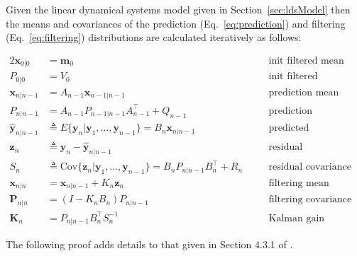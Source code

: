 \begin{theorem}
	\label{thm:kalmanFilterEqs}

    Given the linear dynamical systems model given in
    Section~\ref{sec:ldsModel} then the means and covariances of the prediction
    (Eq.~\ref{eq:prediction}) and filtering (Eq.~\ref{eq:filtering})
    distributions are calculated iteratively as follows:

    \begin{alignat}{2}
        \mathbf{x}_{0|0}&=\mathbf{m}_0&&\text{init filtered mean}\label{eq:x0G0}\\
        P_{0|0}&=V_0&&\text{init filtered covariance}\label{eq:P0G0}\\
        \mathbf{x}_{n|n-1}&=A_{n-1}\mathbf{x}_{n-1|n-1}&&\text{prediction mean}\label{eq:xtGtm1}\\
        P_{n|n-1}&=A_{n-1}P_{n-1|n-1}A_{n-1}^\intercal+Q_{n-1}&&\text{prediction covariance}\label{eq:PtGtm1}\\
        \hat{\mathbf{y}}_{n|n-1}&\triangleq E\{\mathbf{y}_n|\mathbf{y}_1,\ldots,\mathbf{y}_{n-1}\}=B_n\mathbf{x}_{n|n-1}&&\text{predicted observation}\label{eq:ytGtm1}\\
        \mathbf{z}_n&\triangleq\mathbf{y}_n-\hat{\mathbf{y}}_{n|n-1}&&\text{residual}\nonumber\\
        S_n&\triangleq \text{Cov}\{\mathbf{z}_n|\mathbf{y}_1,\ldots,\mathbf{y}_{n-1}\}=B_nP_{n|n-1}B_n^\intercal+R_n\quad&&\text{residual covariance}\label{eq:St}\\
        \mathbf{x}_{n|n}&=\mathbf{x}_{n|n-1}+K_n\mathbf{z}_n&&\text{filtering mean}\label{eq:xtGt}\\
        \mathbf{P}_{n|n}&=(I-K_nB_n)P_{n|n-1}&&\text{filtering covariance}\label{eq:PtGt}\\
        \mathbf{K}_n&=P_{n|n-1}B_n^\intercal S_n^{-1}&&\text{Kalman gain}\label{eq:Kt}
    \end{alignat}

\end{theorem}

The following proof adds details to that given in Section 4.3.1 of
\citet{durbinAndKoopman12}.


